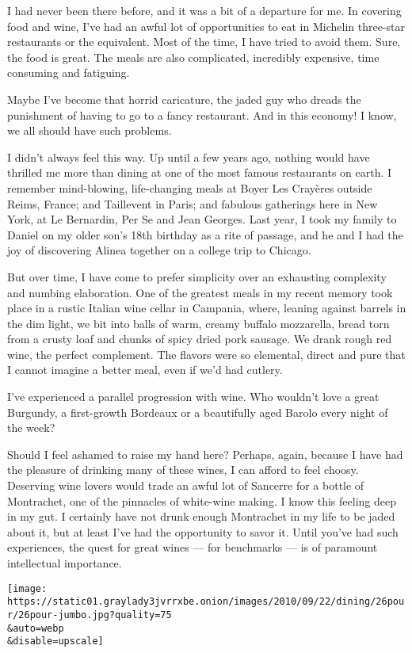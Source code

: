 I had never been there before, and it was a bit of a departure for me.
In covering food and wine, I've had an awful lot of opportunities to eat
in Michelin three-star restaurants or the equivalent. Most of the time,
I have tried to avoid them. Sure, the food is great. The meals are also
complicated, incredibly expensive, time consuming and fatiguing.

Maybe I've become that horrid caricature, the jaded guy who dreads the
punishment of having to go to a fancy restaurant. And in this economy! I
know, we all should have such problems.

I didn't always feel this way. Up until a few years ago, nothing would
have thrilled me more than dining at one of the most famous restaurants
on earth. I remember mind-blowing, life-changing meals at Boyer Les
Crayères outside Reims, France; and Taillevent in Paris; and fabulous
gatherings here in New York, at Le Bernardin, Per Se and Jean Georges.
Last year, I took my family to Daniel on my older son's 18th birthday as
a rite of passage, and he and I had the joy of discovering Alinea
together on a college trip to Chicago.

But over time, I have come to prefer simplicity over an exhausting
complexity and numbing elaboration. One of the greatest meals in my
recent memory took place in a rustic Italian wine cellar in Campania,
where, leaning against barrels in the dim light, we bit into balls of
warm, creamy buffalo mozzarella, bread torn from a crusty loaf and
chunks of spicy dried pork sausage. We drank rough red wine, the perfect
complement. The flavors were so elemental, direct and pure that I cannot
imagine a better meal, even if we'd had cutlery.

I've experienced a parallel progression with wine. Who wouldn't love a
great Burgundy, a first-growth Bordeaux or a beautifully aged Barolo
every night of the week?

Should I feel ashamed to raise my hand here? Perhaps, again, because I
have had the pleasure of drinking many of these wines, I can afford to
feel choosy. Deserving wine lovers would trade an awful lot of Sancerre
for a bottle of Montrachet, one of the pinnacles of white-wine making. I
know this feeling deep in my gut. I certainly have not drunk enough
Montrachet in my life to be jaded about it, but at least I've had the
opportunity to savor it. Until you've had such experiences, the quest
for great wines --- for benchmarks --- is of paramount intellectual
importance.

\texttt{[image: https://static01.graylady3jvrrxbe.onion/images/2010/09/22/dining/26pour/26pour-jumbo.jpg?quality=75\\\&auto=webp\\\&disable=upscale]}

